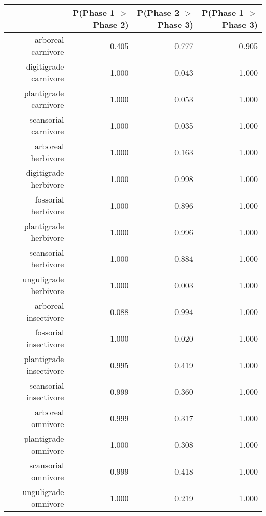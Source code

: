 \begin{table}[ht]
\centering
\begin{tabular}{rrrr}
  \hline
 & P(Phase 1 $>$ Phase 2) & P(Phase 2 $>$ Phase 3) & P(Phase 1 $>$ Phase 3) \\ 
  \hline
arboreal carnivore & 0.405 & 0.777 & 0.905 \\ 
  digitigrade carnivore & 1.000 & 0.043 & 1.000 \\ 
  plantigrade carnivore & 1.000 & 0.053 & 1.000 \\ 
  scansorial carnivore & 1.000 & 0.035 & 1.000 \\ 
  arboreal herbivore & 1.000 & 0.163 & 1.000 \\ 
  digitigrade herbivore & 1.000 & 0.998 & 1.000 \\ 
  fossorial herbivore & 1.000 & 0.896 & 1.000 \\ 
  plantigrade herbivore & 1.000 & 0.996 & 1.000 \\ 
  scansorial herbivore & 1.000 & 0.884 & 1.000 \\ 
  unguligrade herbivore & 1.000 & 0.003 & 1.000 \\ 
  arboreal insectivore & 0.088 & 0.994 & 1.000 \\ 
  fossorial insectivore & 1.000 & 0.020 & 1.000 \\ 
  plantigrade insectivore & 0.995 & 0.419 & 1.000 \\ 
  scansorial insectivore & 0.999 & 0.360 & 1.000 \\ 
  arboreal omnivore & 0.999 & 0.317 & 1.000 \\ 
  plantigrade omnivore & 1.000 & 0.308 & 1.000 \\ 
  scansorial omnivore & 0.999 & 0.418 & 1.000 \\ 
  unguligrade omnivore & 1.000 & 0.219 & 1.000 \\ 
   \hline
\end{tabular}
\label{tab:origin_plant}
\end{table}
